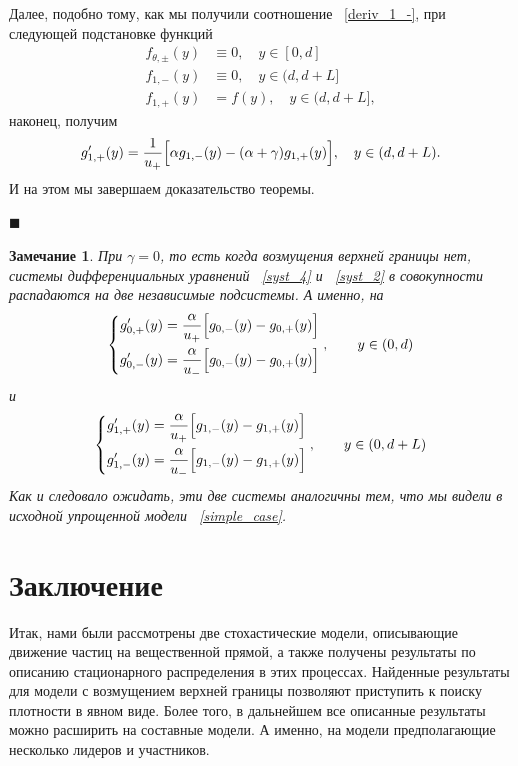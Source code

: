 \documentclass[12pt,a4paper]{article}
\newtheorem{zam}{Замечание}
\begin{document}
Далее, подобно тому, как мы получили соотношение ~\eqref{deriv_1_-}, при следующей подстановке функций
\begin{equation*}
    \begin{aligned}
        f_{\theta, \pm} (y) &\equiv 0, \quad y \in [0, d]\\
        f_{1, -} (y) &\equiv 0, \quad y \in (d, d + L]\\
        f_{1, +} (y) &= f (y), \quad y \in (d, d + L],
    \end{aligned}
\end{equation*}
наконец, получим
$$g_{1, +}'(y) = \frac{1}{u_+} \Bigl[ \alpha g_{1, -}(y) -(\alpha + \gamma) g_{1, +}(y)\Bigr], \quad y \in (d, d + L).$$
И на этом мы завершаем доказательство теоремы.
\begin{flushright}
$\blacksquare$
\end{flushright}
\begin{zam}
При $\gamma = 0$, то есть когда возмущения верхней границы нет, системы дифференциальных уравнений ~\eqref{syst_4} и ~\eqref{syst_2} в совокупности распадаются на две независимые подсистемы. А именно, на 
\begin{equation*}
\left\{ \begin{aligned} 
g_{0, +}'(y) &= \frac{\alpha}{u_+} \Bigl[ g_{0, -}(y) - g_{0, +}(y)\Bigr]\\
g_{0, -}'(y) &= \frac{\alpha}{u_-} \Bigl[ g_{0, -}(y) - g_{0, +}(y)\Bigr]
\end{aligned}
\right., \qquad y \in (0, d)
\end{equation*}
и
\begin{equation*}
\left\{ \begin{aligned} 
g_{1, +}'(y) &= \frac{\alpha}{u_+} \Bigl[ g_{1, -}(y) - g_{1, +}(y)\Bigr]\\
g_{1, -}'(y) &= \frac{\alpha}{u_-} \Bigl[ g_{1, -}(y)- g_{1, +}(y) \Bigr]
\end{aligned}
\right., \qquad y \in (0, d + L)
\end{equation*}
Как и следовало ожидать, эти две системы аналогичны тем, что мы видели в исходной упрощенной модели ~\eqref{simple_case}.
\end{zam}

\section{Заключение}

Итак, нами были рассмотрены две стохастические модели, описывающие движение частиц на вещественной прямой, а также получены результаты по описанию стационарного распределения в этих процессах. Найденные результаты для модели с возмущением верхней границы позволяют приступить к поиску плотности в явном виде. Более того, в дальнейшем все описанные результаты можно расширить на составные модели. А именно, на модели предполагающие несколько лидеров и участников.
\end{document}
